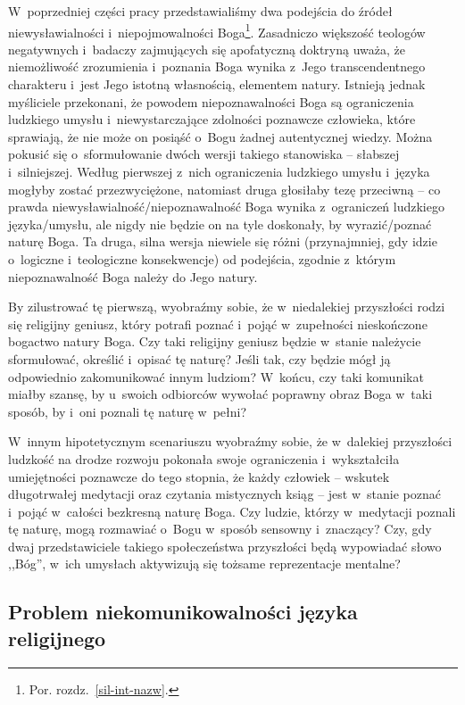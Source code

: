 W~poprzedniej części pracy przedstawialiśmy dwa podejścia do źródeł niewysławialności i~niepojmowalności Boga\footnote{Por. rozdz.~\ref{sil-int-nazw}.}. Zasadniczo większość teologów negatywnych i~badaczy zajmujących się apofatyczną doktryną uważa, że niemożliwość zrozumienia i~poznania Boga wynika z~Jego transcendentnego charakteru i~jest Jego istotną własnością, elementem natury. Istnieją jednak myśliciele przekonani, że powodem niepoznawalności Boga są ograniczenia ludzkiego umysłu i~niewystarczające zdolności poznawcze człowieka, które sprawiają, że nie może on posiąść o~Bogu żadnej autentycznej wiedzy. Można pokusić się o~sformułowanie dwóch wersji takiego stanowiska -- słabszej i~silniejszej. Według pierwszej z~nich ograniczenia ludzkiego umysłu i~języka mogłyby zostać przezwyciężone, natomiast druga głosiłaby tezę przeciwną -- co prawda niewysławialność/niepoznawalność Boga wynika z~ograniczeń ludzkiego języka/umysłu, ale nigdy nie będzie on na tyle doskonały, by wyrazić/poznać naturę Boga. Ta druga, silna wersja niewiele się różni (przynajmniej, gdy idzie o~logiczne i~teologiczne konsekwencje) od podejścia, zgodnie z~którym niepoznawalność Boga należy do Jego natury.

By zilustrować tę pierwszą, wyobraźmy sobie, że w~niedalekiej przyszłości rodzi się religijny geniusz, który potrafi poznać i~pojąć w~zupełności nieskończone bogactwo natury Boga. Czy taki religijny geniusz będzie w~stanie należycie sformułować, określić i~opisać tę naturę? Jeśli tak, czy będzie mógł ją odpowiednio zakomunikować innym ludziom? W~końcu, czy taki komunikat miałby szansę, by u~swoich odbiorców wywołać poprawny obraz Boga w~taki sposób, by i~oni poznali tę naturę w~pełni?

W~innym hipotetycznym scenariuszu wyobraźmy sobie, że w~dalekiej przyszłości ludzkość na drodze rozwoju pokonała swoje ograniczenia i~wykształciła umiejętności poznawcze do tego stopnia, że każdy człowiek -- wskutek długotrwałej medytacji oraz czytania mistycznych ksiąg -- jest w~stanie poznać i~pojąć w~całości bezkresną naturę Boga. Czy ludzie, którzy w~medytacji poznali tę naturę, mogą rozmawiać o~Bogu w~sposób sensowny i~znaczący? Czy, gdy dwaj przedstawiciele takiego społeczeństwa przyszłości będą wypowiadać słowo ,,Bóg'', w~ich umysłach aktywizują się tożsame reprezentacje mentalne?


\subsection{Problem niekomunikowalności języka religijnego}\label{scep-nkom}

